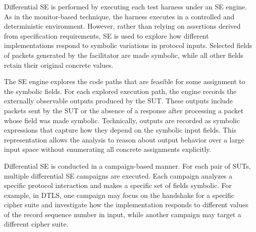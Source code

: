 Differential SE is performed by executing each test harness under an SE engine.
As in the monitor-based technique, the harness executes in a controlled and deterministic environment.
However, rather than relying on assertions derived from specification requirements, SE is used to explore how different implementations respond to symbolic variations in protocol inputs.
Selected fields of packets generated by the facilitator are made symbolic, while all other fields retain their original concrete values.

The SE engine explores the code paths that are feasible for some assignment to the symbolic fields.
For each explored execution path, the engine records the externally observable outputs produced by the SUT.
These outputs include packets sent by the SUT or the absence of a response after processing a packet whose field was made symbolic.
Technically, outputs are recorded as symbolic expressions that capture how they depend on the symbolic input fields.
This representation allows the analysis to reason about output behavior over a large input space without enumerating all concrete assignments explicitly.

Differential SE is conducted in a campaign-based manner.
For each pair of SUTs, multiple differential SE campaigns are executed.
Each campaign analyzes a specific protocol interaction and makes a specific set of fields symbolic.
For example, in DTLS, one campaign may focus on the handshake for a specific cipher suite and investigate how the implementation responds to different values of the record sequence number in input, while another campaign may target a different cipher suite.

